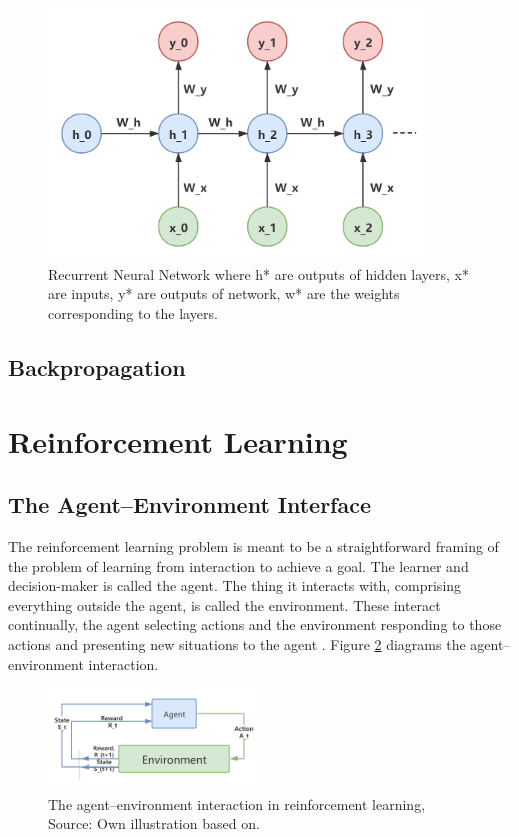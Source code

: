 \begin{figure}[htbp]
\centering
\includegraphics[width=0.9\textwidth]{./images/recurrent-layer-ann.png}
\caption{Recurrent Neural Network where h* are outputs of hidden layers, x* are inputs, y* are outputs of network, w* are the weights corresponding to the layers.}
\label{fig:recurrent-layer-ann}
\end{figure}

\subsection{Backpropagation}

\section{Reinforcement Learning}
\subsection{The Agent–Environment Interface}
The reinforcement learning problem is meant to be a straightforward framing of the problem of learning from interaction to achieve a goal. The learner and decision-maker is called the agent. The thing it interacts with, comprising everything outside the agent, is called the environment. These interact continually, the agent selecting actions and the environment responding to those actions and presenting new situations to the agent \parencite{Sutton2018}. Figure \ref{fig:agent-environment-interaction} diagrams the agent–environment interaction.

\begin{figure}[htbp]
\centering
\includegraphics[width=0.5\textwidth]{./images/agent-environment-interaction.png}
\caption{The agent–environment interaction in reinforcement learning, Source: Own illustration based
on\parencite{Sutton2018}.}
\label{fig:agent-environment-interaction}
\end{figure}


